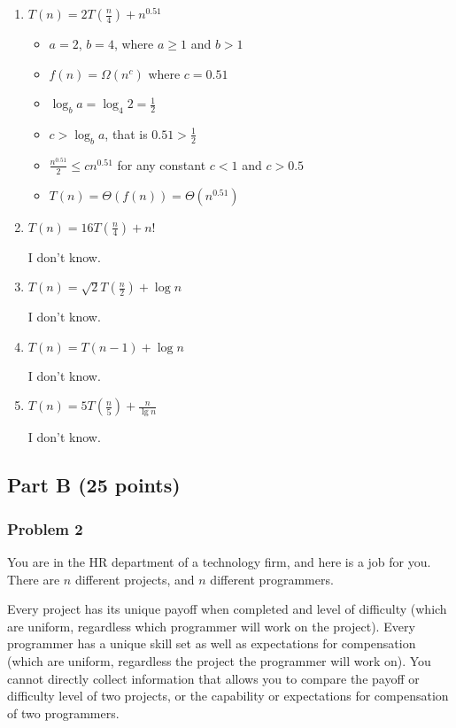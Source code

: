 \documentclass[11pt]{article}
\begin{document}
\begin{enumerate}[label=\Alph*.]
	\item $T(n) = 2T(\frac{n}{4}) + n^{0.51}$
	
	\begin{itemize}
	
		\item $a = 2$, $b = 4$, where $a \geq 1$ and $b > 1$
		\item $f(n) = \Omega(n^c)$ where $c = 0.51$
		\item $\log_b a = \log_4 2 = \frac{1}{2}$
		\item $c > \log_b a$, that is $0.51 > \frac{1}{2}$
		\item $\frac{n^{0.51}}{2} \leq c n^{0.51}$ for any constant $c < 1$ and $c > 0.5$
		\item $T (n) = \Theta(f(n)) = \Theta (n^{0.51})$
	
	\end{itemize}
	
	\item $T(n) = 16 T(\frac{n}{4}) + n!$
	
	I don't know.
	
	\item $T(n) = \sqrt{2} T(\frac{n}{2}) + \log n$
	
	I don't know.
	
	\item $T(n) = T(n-1) + \log n$
	
	I don't know.
	
	\item $T(n) = 5T(\frac{n}{5}) + \frac{n}{\lg n}$
	
	I don't know.
	
\end{enumerate}

\subsection*{Part B (25 points)}

\subsubsection*{Problem 2} 

You are in the HR department of a
technology firm, and here is a job for you.  There are $n$ different
projects, and $n$ different programmers.

Every project has its unique payoff when completed and level of
difficulty (which are uniform, regardless which programmer will work
on the project).  Every programmer has a unique skill set as well as
expectations for compensation (which are uniform, regardless the
project the programmer will work on). You cannot directly collect
information that allows you to compare the payoff or difficulty level
of two projects, or the capability or expectations for compensation of
two programmers.
\end{document}
